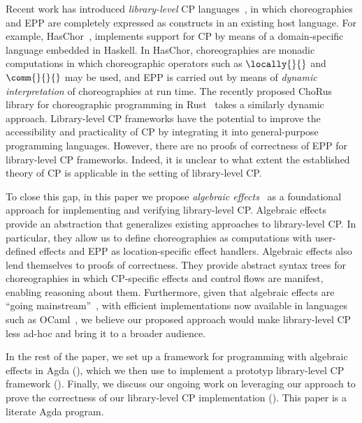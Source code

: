 Recent work has introduced \emph{library-level} CP languages~\citep{shen-2023, kashiwa-2023}, in which choreographies and EPP are completely expressed as constructs in an existing host language.  For example, HasChor~\citep{shen-2023}, implements support for CP by means of a domain-specific language embedded in Haskell.
In HasChor, choreographies are monadic computations in which choreographic operators such as $\locally{}{}$ and $\comm{}{}{}$ may be used, and EPP is carried out by means of \emph{dynamic interpretation} of choreographies at run time.  The recently proposed ChoRus library for choreographic programming in Rust~\citep{kashiwa-2023} takes a similarly dynamic approach.
%
Library-level CP frameworks have the potential to improve the accessibility and practicality of CP by integrating it into general-purpose programming languages.
%
However, there are no proofs of correctness of EPP for library-level CP frameworks. Indeed, it is unclear to what extent the established theory of CP is applicable in the setting of library-level CP.

To close this gap, in this paper we propose \emph{algebraic effects}~\citep{plotkin-2003, plotkin-2013} as a foundational approach for implementing and verifying library-level CP.
%
Algebraic effects provide an abstraction that generalizes existing approaches to library-level CP.
%
In particular, they allow us to define choreographies as computations with user-defined effects and EPP as location-specific effect handlers.
%
Algebraic effects also lend themselves to proofs of correctness.
%
They provide abstract syntax trees for choreographies in which CP-specific effects and control flows are manifest, enabling reasoning about them.
%
Furthermore, given that algebraic effects are ``going mainstream''~\citep{dagstuhl-alg-effects-report}, with efficient implementations now available in languages such as OCaml~\citep{sivaramakrishnan-ocaml-effect-handlers}, we believe our proposed approach would make library-level CP less ad-hoc and bring it to a broader audience.


%
In the rest of the paper, we set up a framework for programming with algebraic effects in Agda (), which we then use to implement a prototyp library-level CP framework ().  Finally, we discuss our ongoing work on leveraging our approach to prove the correctness of our library-level CP implementation ().  This paper is a literate Agda program.



